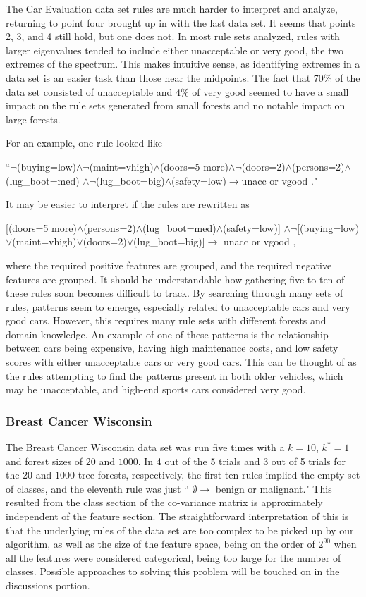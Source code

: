 \documentclass[10pt]{article}
\begin{document}
The Car Evaluation data set rules are much harder to interpret and analyze, returning to point four brought up in with the last data set. It seems that points 2, 3, and 4 still hold, but one does not. In most rule sets analyzed, rules with larger eigenvalues tended to include either unacceptable or very good, the two extremes of the spectrum. This makes intuitive sense, as identifying extremes in a data set is an easier task than those near the midpoints. The fact that 70\% of the data set consisted of unacceptable and 4\% of very good seemed to have a small impact on the rule sets generated from small forests and no notable impact on large forests. 

For an example, one rule looked like
\begin{center}
``$\neg$(buying=low)$\land \neg$(maint=vhigh)$\land$(doors=5 more)$\land \neg$(doors=2)$\land$(persons=2)$\land$(lug\_boot=med) $\land \neg$(lug\_boot=big)$\land$(safety=low)$\longrightarrow$unacc or vgood  ."
\end{center}
It may be easier to interpret if the rules are rewritten as 
\begin{center}
[(doors=5 more)$\land$(persons=2)$\land$(lug\_boot=med)$\land$(safety=low)] $\land\neg$[(buying=low)$\lor$(maint=vhigh)$\lor$(doors=2)$\lor$(lug\_boot=big)]$\longrightarrow$ unacc or vgood ,
\end{center}
where the required positive features are grouped, and the required negative features are grouped. It should be understandable how gathering five to ten of these rules soon becomes difficult to track. By searching through many sets of rules, patterns seem to emerge, especially related to unacceptable cars and very good cars. However, this requires many rule sets with different forests and domain knowledge. An example of one of these patterns is the relationship between cars being expensive, having high maintenance costs, and low safety scores with either unacceptable cars or very good cars. This can be thought of as the rules attempting to find the patterns present in both older vehicles, which may be unacceptable, and high-end sports cars considered very good.

\subsubsection{Breast Cancer Wisconsin}
The Breast Cancer Wisconsin data set was run five times with a $k=10$, $k^*=1$ and forest sizes of $20$ and $1000$. In 4 out of the 5 trials and 3 out of 5 trials for the $20$ and $1000$ tree forests, respectively, the first ten rules implied the empty set of classes, and the eleventh rule was just `` $\emptyset \longrightarrow$ benign or malignant." This resulted from the class section of the co-variance matrix is approximately independent of the feature section. The straightforward interpretation of this is that the underlying rules of the data set are too complex to be picked up by our algorithm, as well as the size of the feature space, being on the order of $2^{90}$ when all the features were considered categorical, being too large for the number of classes. Possible approaches to solving this problem will be touched on in the discussions portion.
\end{document}
